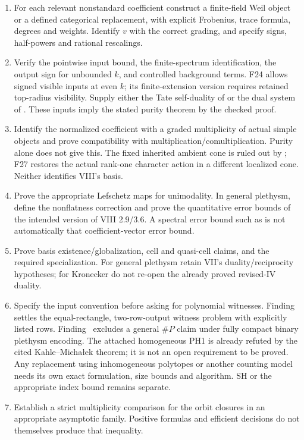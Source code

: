 \begin{enumerate}
\item {} For each relevant nonstandard coefficient construct a finite-field Weil object or a defined categorical replacement, with explicit Frobenius, trace formula, degrees and weights. Identify $v$ with the correct grading, and specify signs, half-powers and rational rescalings.
\item {} Verify the pointwise input bound, the finite-spectrum identification, the output sign for unbounded $k$, and controlled background terms. F24 allows signed visible inputs at even $k$; its finite-extension version requires retained top-radius visibility. Supply either the Tate self-duality of  or the dual system of . These inputs imply the stated purity theorem by the checked proof.
\item {} Identify the normalized coefficient with a graded multiplicity of actual simple objects and prove compatibility with multiplication/comultiplication. Purity alone does not give this. The fixed inherited ambient cone is ruled out by ; F27 restores the actual rank-one character action in a different localized cone. Neither identifies VIII's basis.
\item {} Prove the appropriate Lefschetz maps for unimodality. In general plethysm, define the nonflatness correction and prove the quantitative error bounds of the intended version of VIII 2.9/3.6. A spectral error bound such as  is not automatically that coefficient-vector error bound.
\item {} Prove basis existence/globalization, cell and quasi-cell claims, and the required specialization. For general plethysm retain VII's duality/reciprocity hypotheses; for Kronecker do not re-open the already proved revised-IV duality.
\item {} Specify the input convention before asking for polynomial witnesses. Finding~ settles the equal-rectangle, two-row-output witness problem with explicitly listed rows. Finding~ excludes a general \(\#P\) claim under fully compact binary plethysm encoding. The attached homogeneous PH1 is already refuted by the cited Kahle--Micha{\l}ek theorem; it is not an open requirement to be proved. Any replacement using inhomogeneous polytopes or another counting model needs its own exact formulation, size bounds and algorithm. SH or the appropriate index bound remains separate.
\item {} Establish a strict multiplicity comparison for the orbit closures in an appropriate asymptotic family. Positive formulas and efficient decisions do not themselves produce that inequality.
\end{enumerate}
